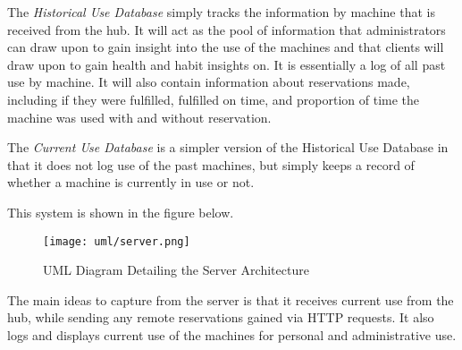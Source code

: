\documentclass[PPFS.tex]{template/subfiles}
\begin{document}
The \textit{Historical Use Database} simply tracks the information by machine that is received from the hub. It will act as the pool of information that administrators can draw upon to gain insight into the use of the machines and that clients will draw upon to gain health and habit insights on. It is essentially a log of all past use by machine. It will also contain information about reservations made, including if they were fulfilled, fulfilled on time, and proportion of time the machine was used with and without reservation.

The \textit{Current Use Database} is a simpler version of the Historical Use Database in that it does not log use of the past machines, but simply keeps a record of whether a machine is currently in use or not.

This system is shown in the figure below.

\begin{figure}[H]
    \centering
    \texttt{[image: uml/server.png]}
    \caption{UML Diagram Detailing the Server Architecture}
\end{figure}

The main ideas to capture from the server is that it receives current use from the hub, while sending any remote reservations gained via HTTP requests. It also logs and displays current use of the machines for personal and administrative use.
\end{document}
